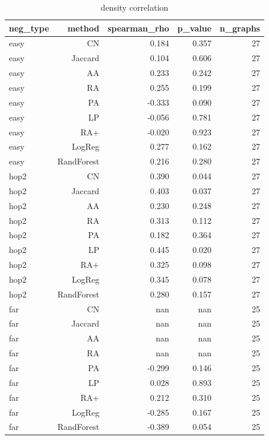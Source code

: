 \begin{table}[t]
\centering
\caption{density correlation}
\label{tab:density_correlation}
\begin{tabular}{lrrrr}
\hline
neg\_type & method & spearman\_rho & p\_value & n\_graphs \\
\hline
easy & CN & 0.184 & 0.357 & 27 \\
easy & Jaccard & 0.104 & 0.606 & 27 \\
easy & AA & 0.233 & 0.242 & 27 \\
easy & RA & 0.255 & 0.199 & 27 \\
easy & PA & -0.333 & 0.090 & 27 \\
easy & LP & -0.056 & 0.781 & 27 \\
easy & RA+ & -0.020 & 0.923 & 27 \\
easy & LogReg & 0.277 & 0.162 & 27 \\
easy & RandForest & 0.216 & 0.280 & 27 \\
hop2 & CN & 0.390 & 0.044 & 27 \\
hop2 & Jaccard & 0.403 & 0.037 & 27 \\
hop2 & AA & 0.230 & 0.248 & 27 \\
hop2 & RA & 0.313 & 0.112 & 27 \\
hop2 & PA & 0.182 & 0.364 & 27 \\
hop2 & LP & 0.445 & 0.020 & 27 \\
hop2 & RA+ & 0.325 & 0.098 & 27 \\
hop2 & LogReg & 0.345 & 0.078 & 27 \\
hop2 & RandForest & 0.280 & 0.157 & 27 \\
far & CN & nan & nan & 25 \\
far & Jaccard & nan & nan & 25 \\
far & AA & nan & nan & 25 \\
far & RA & nan & nan & 25 \\
far & PA & -0.299 & 0.146 & 25 \\
far & LP & 0.028 & 0.893 & 25 \\
far & RA+ & 0.212 & 0.310 & 25 \\
far & LogReg & -0.285 & 0.167 & 25 \\
far & RandForest & -0.389 & 0.054 & 25 \\
\hline
\end{tabular}
\end{table}